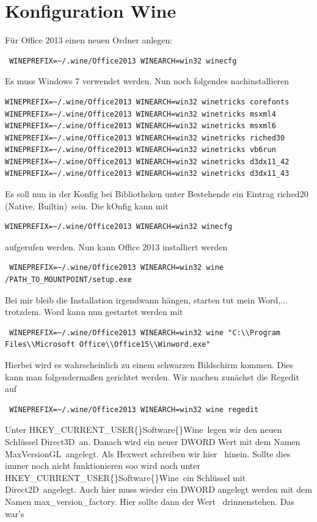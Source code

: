 \documentclass[11pt,fleqn]{book} %
\numberwithin{equation}{section} %
\numberwithin{figure}{section} %
\numberwithin{table}{section} %
\begin{document}
\section{Konfiguration Wine}
Für Office 2013 einen neuen Ordner anlegen:
\begin{lstlisting}
 WINEPREFIX=~/.wine/Office2013 WINEARCH=win32 winecfg
\end{lstlisting}
Es muss Windows 7 verwendet werden. Nun noch folgendes nachinstallieren
\begin{lstlisting}
WINEPREFIX=~/.wine/Office2013 WINEARCH=win32 winetricks corefonts
WINEPREFIX=~/.wine/Office2013 WINEARCH=win32 winetricks msxml4
WINEPREFIX=~/.wine/Office2013 WINEARCH=win32 winetricks msxml6
WINEPREFIX=~/.wine/Office2013 WINEARCH=win32 winetricks riched30
WINEPREFIX=~/.wine/Office2013 WINEARCH=win32 winetricks vb6run
WINEPREFIX=~/.wine/Office2013 WINEARCH=win32 winetricks d3dx11_42
WINEPREFIX=~/.wine/Office2013 WINEARCH=win32 winetricks d3dx11_43
\end{lstlisting}
Es soll nun in der Konfig bei Bibliotheken unter Bestehende ein Eintrag \glqq *riched20 (Native, Builtin)\grqq \ sein. Die kOnfig kann mit
\begin{lstlisting}
WINEPREFIX=~/.wine/Office2013 WINEARCH=win32 winecfg
\end{lstlisting}
aufgerufen werden. Nun kann Office 2013 installiert werden
\begin{lstlisting}
 WINEPREFIX=~/.wine/Office2013 WINEARCH=win32 wine /PATH_TO_MOUNTPOINT/setup.exe
\end{lstlisting}
Bei mir bleib die Installation irgendwann hängen, starten tut mein Word,... trotzdem. Word kann nun gestartet werden mit
\begin{lstlisting}
 WINEPREFIX=~/.wine/Office2013 WINEARCH=win32 wine "C:\\Program Files\\Microsoft Office\\Office15\\Winword.exe"
\end{lstlisting}
Hierbei wird es wahrscheinlich zu einem schwarzen Bildschirm kommen. Dies kann man folgendermaßen gerichtet werden. Wir machen zunächst die Regedit auf
\begin{lstlisting}
 WINEPREFIX=~/.wine/Office2013 WINEARCH=win32 wine regedit
\end{lstlisting}
Unter \glqq HKEY\_CURRENT\_USER\{\}Software\{\}Wine\grqq \ legen wir den neuen Schlüssel \glqq Direct3D\grqq \ an. Danach wird ein neuer DWORD Wert mit dem Namen \glqq MaxVersionGL\grqq \ angelegt. Als Hexwert schreiben wir hier \grqq \ hinein. Sollte dies immer noch nicht funktionieren soo wird noch unter \glqq HKEY\_CURRENT\_USER\{\}Software\{\}Wine\grqq \ ein Schlüssel mit \glqq Direct2D\grqq \ angelegt. Auch hier muss wieder ein DWORD angelegt werden mit dem Namen \glqq max\_version\_factory\grqq. Hier sollte dann der Wert \grqq \ drinnenstehen. Das war's
\end{document}
